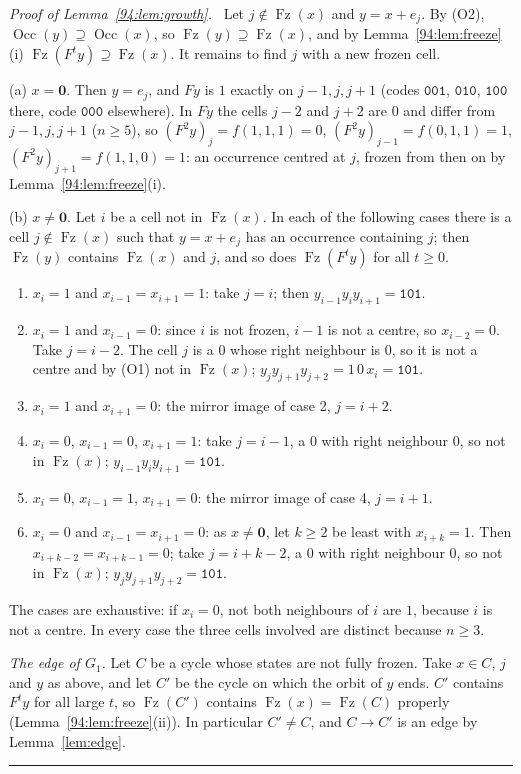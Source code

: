 \documentclass[10pt,a4paper]{article}
\newcommand{\qedmark}{\rule{1.1ex}{1.1ex}}
\newenvironment{proof}[1][Proof]{\par\smallskip\noindent\textit{#1.}\ }{\hfill\qedmark\par\smallskip}
\newcommand{\zero}{\mathbf{0}}                %
\newcommand{\Gone}{G_1}                       %
\newcommand{\code}[1]{\mathtt{#1}}            %
\newcommand{\Occ}{\operatorname{Occ}}         %
\newcommand{\Fz}{\operatorname{Fz}}           %
\begin{document}
\begin{proof}[Proof of Lemma~\ref{94:lem:growth}]
Let $j\notin\Fz(x)$ and $y=x+e_j$. By (O2), $\Occ(y)\supseteq\Occ(x)$, so $\Fz(y)\supseteq\Fz(x)$, and by
Lemma~\ref{94:lem:freeze}(i) $\Fz(F^ty)\supseteq\Fz(x)$. It remains to find $j$ with a new frozen cell.

(a) $x=\zero$. Then $y=e_j$, and $Fy$ is $1$ exactly on $j-1,j,j+1$ (codes $\code{001}$, $\code{010}$,
$\code{100}$ there, code $\code{000}$ elsewhere). In $Fy$ the cells $j-2$ and $j+2$ are $0$ and differ from
$j-1,j,j+1$ ($n\ge5$), so $(F^2y)_j=f(1,1,1)=0$, $(F^2y)_{j-1}=f(0,1,1)=1$, $(F^2y)_{j+1}=f(1,1,0)=1$: an
occurrence centred at $j$, frozen from then on by Lemma~\ref{94:lem:freeze}(i).

(b) $x\ne\zero$. Let $i$ be a cell not in $\Fz(x)$. In each of the following cases there is a cell
$j\notin\Fz(x)$ such that $y=x+e_j$ has an occurrence containing $j$; then $\Fz(y)$ contains $\Fz(x)$ and $j$, and
so does $\Fz(F^ty)$ for all $t\ge0$.
\begin{enumerate}[label=\arabic*.,leftmargin=*,nosep]
\item $x_i=1$ and $x_{i-1}=x_{i+1}=1$: take $j=i$; then $y_{i-1}y_iy_{i+1}=\code{101}$.
\item $x_i=1$ and $x_{i-1}=0$: since $i$ is not frozen, $i-1$ is not a centre, so $x_{i-2}=0$. Take $j=i-2$. The
cell $j$ is a $0$ whose right neighbour is $0$, so it is not a centre and by (O1) not in $\Fz(x)$;
$y_jy_{j+1}y_{j+2}=1\,0\,x_i=\code{101}$.
\item $x_i=1$ and $x_{i+1}=0$: the mirror image of case 2, $j=i+2$.
\item $x_i=0$, $x_{i-1}=0$, $x_{i+1}=1$: take $j=i-1$, a $0$ with right neighbour $0$, so not in $\Fz(x)$;
$y_{i-1}y_iy_{i+1}=\code{101}$.
\item $x_i=0$, $x_{i-1}=1$, $x_{i+1}=0$: the mirror image of case 4, $j=i+1$.
\item $x_i=0$ and $x_{i-1}=x_{i+1}=0$: as $x\ne\zero$, let $k\ge2$ be least with $x_{i+k}=1$. Then
$x_{i+k-2}=x_{i+k-1}=0$; take $j=i+k-2$, a $0$ with right neighbour $0$, so not in $\Fz(x)$;
$y_jy_{j+1}y_{j+2}=\code{101}$.
\end{enumerate}
The cases are exhaustive: if $x_i=0$, not both neighbours of $i$ are $1$, because $i$ is not a centre. In every
case the three cells involved are distinct because $n\ge3$.

\emph{The edge of $\Gone$.} Let $C$ be a cycle whose states are not fully frozen. Take $x\in C$, $j$ and $y$ as
above, and let $C'$ be the cycle on which the orbit of $y$ ends. $C'$ contains $F^ty$ for all large $t$, so
$\Fz(C')$ contains $\Fz(x)=\Fz(C)$ properly (Lemma~\ref{94:lem:freeze}(ii)). In particular $C'\ne C$, and
$C\to C'$ is an edge by Lemma~\ref{lem:edge}.
\end{proof}
\end{document}
